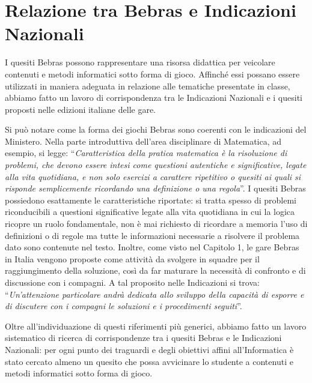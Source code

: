\documentclass[12pt]{report}
\begin{document}
\section{Relazione tra Bebras e Indicazioni Nazionali} \label{classIndicazioni}

I quesiti Bebras possono rappresentare una risorsa didattica per veicolare contenuti e metodi informatici sotto forma di gioco. Affinché essi possano essere utilizzati in maniera adeguata in relazione alle tematiche presentate in classe, abbiamo fatto un lavoro di corrispondenza tra le Indicazioni Nazionali e i quesiti proposti nelle edizioni italiane delle gare.

Si può notare come la forma dei giochi Bebras sono coerenti con le indicazioni del Ministero.
Nella parte introduttiva dell'area disciplinare di Matematica, ad esempio, si legge: ``\textit{Caratteristica della pratica matematica è la risoluzione di problemi, che devono essere intesi come questioni autentiche e significative, legate alla vita quotidiana, e non solo esercizi a carattere ripetitivo o quesiti ai quali si risponde semplicemente ricordando una definizione o una regola}''. I quesiti Bebras possiedono esattamente le caratteristiche riportate: si tratta spesso di problemi riconducibili a questioni significative legate alla vita quotidiana in cui la logica ricopre un ruolo fondamentale, non è mai richiesto di ricordare a memoria l’uso di definizioni o di regole ma tutte le informazioni necessarie a risolvere il problema dato sono contenute nel testo.
Inoltre, come visto nel Capitolo 1, le gare Bebras in Italia vengono proposte come attività da svolgere in squadre per il raggiungimento della soluzione, così da far maturare la necessità di confronto e di discussione con i compagni. A tal proposito nelle Indicazioni si trova: ``\textit{Un’attenzione particolare andrà dedicata allo sviluppo della capacità di esporre e di discutere con i compagni le soluzioni e i procedimenti seguiti}''. 

Oltre all'individuazione di questi riferimenti più generici, abbiamo fatto un lavoro sistematico di ricerca di corrispondenze tra i quesiti Bebras e le Indicazioni Nazionali: per ogni punto dei traguardi e degli obiettivi affini all'Informatica è stato cercato almeno un quesito che possa avvicinare lo studente a contenuti e metodi informatici sotto forma di gioco.
\end{document}
